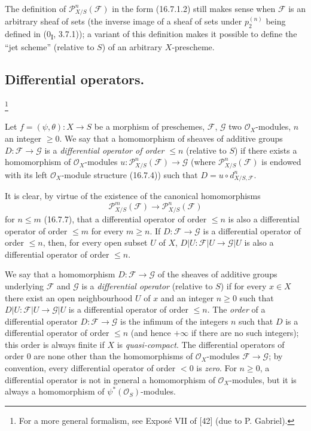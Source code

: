 \begin{remark}[16.7.10]
\label{IV.16.7.10}
The definition of $\mathscr{P}_{X/S}^n(\mathscr{F})$ in the form (16.7.1.2)
still makes sense when $\mathscr{F}$ is an arbitrary sheaf of sets
(the inverse image of a sheaf of sets under $p_2^{(n)}$ being defined
in (0\textsubscript{I}, 3.7.1)); a variant of this definition makes it
possible to define the ``jet scheme'' (relative to $S$) of an arbitrary
$X$-prescheme.
\end{remark}

\subsection{Differential operators.}
\footnote{For a more general formalism, see Exposé VII of [42]
(due to P. Gabriel).}

\begin{definition}[16.8.1]\label{IV.16.8.1}
Let $f=(\psi,\theta):X\to S$ be a morphism of preschemes,
$\mathscr{F}$, $\mathscr{G}$ two $\mathcal{O}_X$-modules, $n$ an integer
$\geq0$. We say that a homomorphism of sheaves of additive groups
$D:\mathscr{F}\to\mathscr{G}$ is a \emph{differential operator of order
$\leq n$} (relative to $S$) if there exists a homomorphism of
$\mathcal{O}_X$-modules
$u:\mathscr{P}_{X/S}^n(\mathscr{F})\to\mathscr{G}$ (where
$\mathscr{P}_{X/S}^n(\mathscr{F})$ is endowed with its left
$\mathcal{O}_X$-module structure (16.7.4)) such that
$D=u\circ d_{X/S,\mathscr{F}}^n$.
\end{definition}

It is clear, by virtue of the existence of the canonical homomorphisms
\[
  \mathscr{P}_{X/S}^m(\mathscr{F})
  \longrightarrow\mathscr{P}_{X/S}^n(\mathscr{F})
\]
for $n\leq m$ (16.7.7), that a differential operator of order $\leq n$ is
also a differential operator of order $\leq m$ for every $m\geq n$. If
$D:\mathscr{F}\to\mathscr{G}$ is a differential operator of order
$\leq n$, then, for every open subset $U$ of $X$,
$D|U:\mathscr{F}|U\to\mathscr{G}|U$ is also a differential operator
of order $\leq n$.

We say that a homomorphism $D:\mathscr{F}\to\mathscr{G}$ of the sheaves of
additive groups underlying $\mathscr{F}$ and $\mathscr{G}$ is a
\emph{differential operator} (relative to $S$) if for every $x\in X$ there
exist an open neighbourhood $U$ of $x$ and an integer $n\geq0$ such that
$D|U:\mathscr{F}|U\to\mathscr{G}|U$ is a differential operator of order
$\leq n$. The \emph{order} of a differential operator
$D:\mathscr{F}\to\mathscr{G}$ is the infimum of the integers $n$ such
that $D$ is a differential operator of order $\leq n$ (and hence $+\infty$
if there are no such integers); this order is always finite if $X$ is
\emph{quasi-compact}. The differential operators of order $0$ are none other
than the homomorphisms of $\mathcal{O}_X$-modules
$\mathscr{F}\to\mathscr{G}$; by convention, every differential operator
of order $<0$ is \emph{zero}. For $n\geq0$, a differential operator is
not in general a homomorphism of $\mathcal{O}_X$-modules, but it is always
a homomorphism of $\psi^*(\mathcal{O}_S)$-modules.


